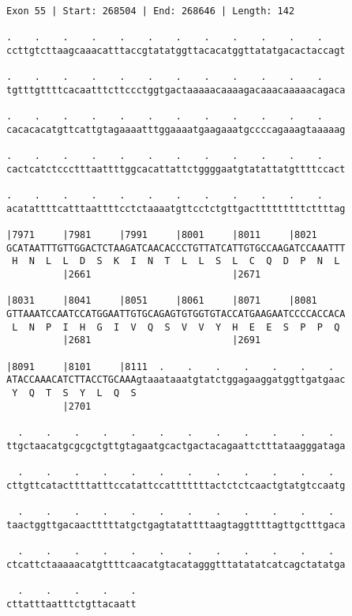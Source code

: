 \documentclass{article}
\begin{document}
\begin{Verbatim}[fontfamily=courier]
Exon 55 | Start: 268504 | End: 268646 | Length: 142

.    .    .    .    .    .    .    .    .    .    .    .    
ccttgtcttaagcaaacatttaccgtatatggttacacatggttatatgacactaccagt

.    .    .    .    .    .    .    .    .    .    .    .    
tgtttgttttcacaatttcttccctggtgactaaaaacaaaagacaaacaaaaacagaca

.    .    .    .    .    .    .    .    .    .    .    .    
cacacacatgttcattgtagaaaatttggaaaatgaagaaatgccccagaaagtaaaaag

.    .    .    .    .    .    .    .    .    .    .    .    
cactcatctccctttaattttggcacattattctggggaatgtatattatgttttccact

.    .    .    .    .    .    .    .    .    .    .    .    
acatattttcatttaattttcctctaaaatgttcctctgttgactttttttttcttttag

|7971     |7981     |7991     |8001     |8011     |8021     
GCATAATTTGTTGGACTCTAAGATCAACACCCTGTTATCATTGTGCCAAGATCCAAATTT
 H  N  L  L  D  S  K  I  N  T  L  L  S  L  C  Q  D  P  N  L 
          |2661                         |2671               

|8031     |8041     |8051     |8061     |8071     |8081     
GTTAAATCCAATCCATGGAATTGTGCAGAGTGTGGTGTACCATGAAGAATCCCCACCACA
 L  N  P  I  H  G  I  V  Q  S  V  V  Y  H  E  E  S  P  P  Q 
          |2681                         |2691               

|8091     |8101     |8111  .    .    .    .    .    .    .  
ATACCAAACATCTTACCTGCAAAgtaaataaatgtatctggagaaggatggttgatgaac
 Y  Q  T  S  Y  L  Q  S                                     
          |2701                                             

  .    .    .    .    .    .    .    .    .    .    .    .  
ttgctaacatgcgcgctgttgtagaatgcactgactacagaattctttataagggataga

  .    .    .    .    .    .    .    .    .    .    .    .  
cttgttcatacttttatttccatattccatttttttactctctcaactgtatgtccaatg

  .    .    .    .    .    .    .    .    .    .    .    .  
taactggttgacaactttttatgctgagtatattttaagtaggttttagttgctttgaca

  .    .    .    .    .    .    .    .    .    .    .    .  
ctcattctaaaaacatgttttcaacatgtacatagggtttatatatcatcagctatatga

  .    .    .    .    .
cttatttaatttctgttacaatt
\end{Verbatim}
\newpage
\end{document}

